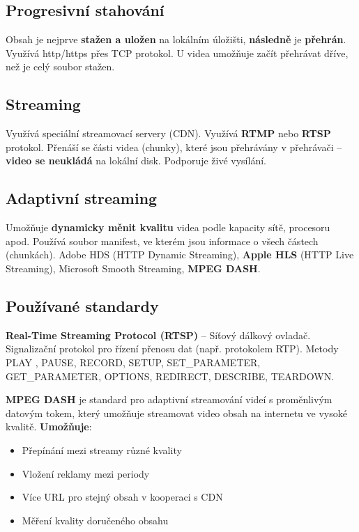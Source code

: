 \subsection{Progresivní stahování}

Obsah je nejprve \textbf{stažen a uložen} na lokálním úložišti, \textbf{následně} je \textbf{přehrán}. Využívá http/https přes TCP protokol. U videa umožňuje začít přehrávat dříve, než je celý soubor stažen.

\subsection{Streaming}

Využívá speciální streamovací servery (CDN). Využívá \textbf{RTMP} nebo \textbf{RTSP} protokol. Přenáší se části videa (chunky), které jsou přehrávány v přehrávači -- \textbf{video se neukládá} na lokální disk. Podporuje živé vysílání.

\subsection{Adaptivní streaming}

Umožňuje \textbf{dynamicky měnit kvalitu} videa podle kapacity sítě, procesoru apod. Používá soubor manifest, ve kterém jsou informace o všech částech (chunkách). Adobe HDS (HTTP Dynamic Streaming), \textbf{Apple HLS} (HTTP Live Streaming), Microsoft Smooth Streaming, \textbf{MPEG DASH}.

\subsection{Používané standardy}

\textbf{Real-Time Streaming Protocol (RTSP)} -- Síťový dálkový ovladač. Signalizační protokol pro řízení přenosu dat (např. protokolem RTP). Metody PLAY , PAUSE, RECORD, SETUP, SET\_PARAMETER, GET\_PARAMETER, OPTIONS, REDIRECT, DESCRIBE, TEARDOWN.

\textbf{MPEG DASH}
je standard pro adaptivní streamování videí s proměnlivým datovým tokem, který umožňuje streamovat video obsah na internetu ve vysoké kvalitě. \textbf{Umožňuje}: \vspace{-4mm}

\begin{itemize}
    \item Přepínání mezi streamy různé kvality
\item Vložení reklamy mezi periody
\item Více URL pro stejný obsah v kooperaci s CDN
\item Měření kvality doručeného obsahu
\end{itemize}


